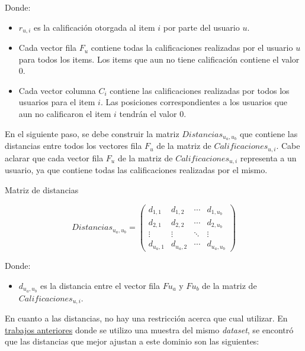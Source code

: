 \documentclass[11pt,a4paper,twoside]{thesis}
\begin{document}
\begin{description}
	\item[Donde:]
\end{description}
\begin{itemize}
	\item $r_{u,i}$ es la calificación otorgada al item $i$ por parte del usuario $u$.
	\item Cada vector fila $F_u$ contiene todas la calificaciones realizadas por el usuario $u$ para todos los items. Los items que aun no tiene calificación contiene el valor $0$.
	\item Cada vector columna $C_i$ contiene las calificaciones realizadas por todos los usuarios para el item $i$. Las posiciones correspondientes a los usuarios que aun no calificaron el item $i$ tendrán el valor $0$. 
\end{itemize}


En el siguiente paso, se debe construir la matriz $Distancias_{u_a,u_b}$ que contiene las distancias entre todos los vectores fila $F_u$ de la matriz de $Calificaciones_{u,i}$.
Cabe aclarar que cada vector fila $F_u$ de la matriz de $Calificaciones_{u,i}$ representa a un usuario, ya que contiene todas las calificaciones realizadas por el mismo.


\clearpage
\begin{description}
	\item[Matriz de distancias]
\end{description}
\begin{equation*}
	Distancias_{u_a,u_b} =
	\begin{pmatrix}
	d_{1,1} & d_{1,2} & \cdots & d_{1,u_b} \\
	d_{2,1} & d_{2,2} & \cdots & d_{2,u_b} \\
	\vdots  & \vdots  & \ddots & \vdots  \\
	d_{u_a,1} & d_{u_a,2} & \cdots & d_{u_a,u_b} 
	\end{pmatrix}
\end{equation*}


\begin{description}
	\item[Donde:]
\end{description}
\begin{itemize}
	\item $d_{u_a,u_b}$ es la distancia entre el vector fila $F{u_a}$ y $F{u_b}$ de la matriz de $Calificaciones_{u,i}$.
\end{itemize}


En cuanto a las distancias, no hay una restricción acerca que cual utilizar. En \href{https://github.com/adrianmarino/knn-cf-rec-sys/blob/master/notebooks/knn-cf-rec-sys.ipynb}{trabajos anteriores} donde se utilizo una muestra del mismo \textit{dataset}, se encontró que las distancias que mejor ajustan a este dominio son las siguientes:
\end{document}

